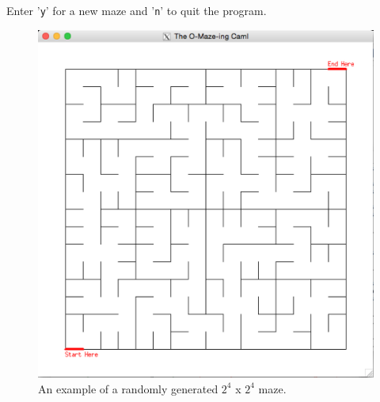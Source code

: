 \documentclass[11pt, margin=1in]{article}
\begin{document}
Enter '\texttt{y}' for a new maze and  '\texttt{n}' to quit the program.

\newpage
\begin{figure}[H]
\begin{center}
\includegraphics[scale=0.3]{example.jpg}
\caption{An example of a randomly generated $2^4$ x $2^4$ maze.}
\end{center}
\end{figure}
\end{document}
